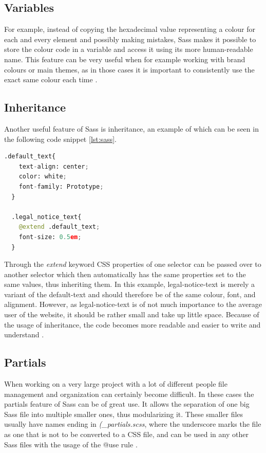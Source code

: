 \subsection{Variables}
For example, instead of copying the hexadecimal value representing a colour for each and every element and possibly making mistakes, Sass makes it possible
to store the colour code in a variable and access it using its more human-readable name. This feature can be very useful when for example working with brand
colours or main themes, as in those cases it is important to consistently use the exact same colour each time \cite{SassFeatures}.
\\
\subsection{Inheritance}
Another useful feature of Sass is inheritance, an example of which can be seen in the following code snippet \ref{lst:sass}.

\begin{lstlisting}[language=Python,caption=Textstyling in Sass,label=lst:sass]
  .default_text{
    text-align: center;
    color: white;
    font-family: Prototype;
  }

  .legal_notice_text{
    @extend .default_text;
    font-size: 0.5em;
  }
\end{lstlisting}

Through the \emph{extend} keyword CSS properties of one selector can be passed over to another selector which then automatically has the 
same properties set to the same values, thus inheriting them. In this example, legal-notice-text is merely a variant of the 
default-text and should therefore be of the same colour, font, and alignment. However, as legal-notice-text is of not much 
importance to the average user of the website, it should be rather small and take up little space. Because of the usage of 
inheritance, the code becomes more readable and easier to write and understand \cite{SassFeatures}.
\\
\subsection{Partials}
When working on a very large project with a lot of different people file management and organization can certainly become difficult. In
these cases the partials feature of Sass can be of great use. It allows the separation of one big Sass file into multiple smaller ones,
thus modularizing it. These smaller files usually have names ending in \emph{(\_partials.scss}, where the underscore marks the file as one
that is not to be converted to a CSS file, and can be used in any other Sass files with the usage of the @use rule \cite{SassFeatures}.
\\
